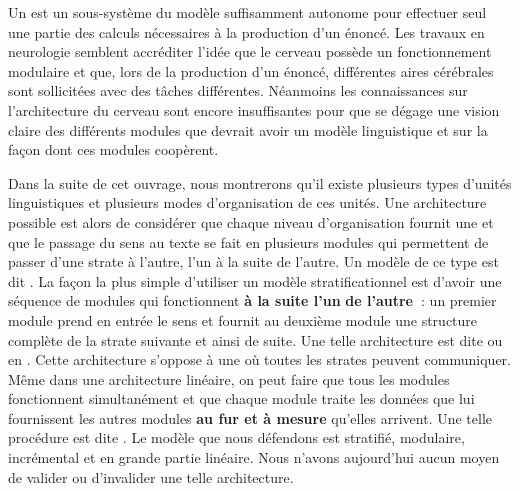 Un  est un sous-système du modèle suffisamment autonome pour effectuer seul une partie des calculs nécessaires à la production d’un énoncé. Les travaux en neurologie semblent accréditer l’idée que le cerveau possède un fonctionnement modulaire et que, lors de la production d’un énoncé, différentes aires cérébrales sont sollicitées avec des tâches différentes. Néanmoins les connaissances sur l’architecture du cerveau sont encore insuffisantes pour que se dégage une vision claire des différents modules que devrait avoir un modèle linguistique et sur la façon dont ces modules coopèrent.

Dans la suite de cet ouvrage, nous montrerons qu’il existe plusieurs types d’unités linguistiques et plusieurs modes d’organisation de ces unités. Une architecture possible est alors de considérer que chaque niveau d’organisation fournit une  et que le passage du sens au texte se fait en plusieurs modules qui permettent de passer d’une strate à l’autre, l’un à la suite de l’autre. Un modèle de ce type est dit . La façon la plus simple d’utiliser un modèle stratificationnel est d’avoir une séquence de modules qui fonctionnent \textbf{à la suite l’un} \textbf{de l’autre~}: un premier module prend en entrée le sens et fournit au deuxième module une structure complète de la strate suivante et ainsi de suite. Une telle architecture est dite  ou en . Cette architecture s’oppose à une  où toutes les strates peuvent communiquer. Même dans une architecture linéaire, on peut faire que tous les modules fonctionnent simultanément et que chaque module traite les données que lui fournissent les autres modules \textbf{au fur et à mesure} qu’elles arrivent. Une telle procédure est dite . Le modèle que nous défendons est stratifié, modulaire, incrémental et en grande partie linéaire. Nous n’avons aujourd’hui aucun moyen de valider ou d’invalider une telle architecture.

